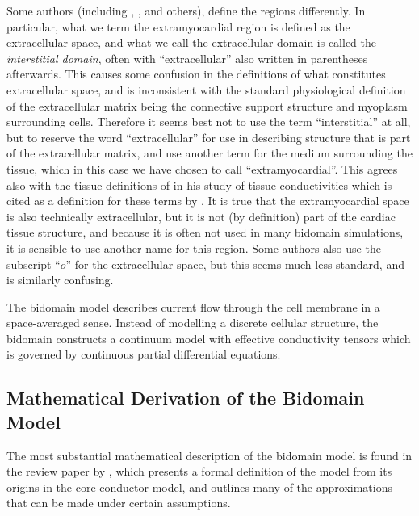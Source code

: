 Some authors (including \citet{pollard:pilkington:1993},
\citet{henriquez:1993}, \citet{plonsey:1987} and others), define the
regions differently.  In particular, what we term the extramyocardial region
is defined as the extracellular space, and what we call the extracellular
domain is called the \emph{interstitial domain}, often with ``extracellular''
also written in parentheses afterwards.  This causes some confusion in the
definitions of what constitutes extracellular space, and is inconsistent with
the standard physiological definition of the extracellular matrix being the
connective support structure and myoplasm surrounding cells.  Therefore it
seems best not to use the term ``interstitial'' at all, but to reserve the
word ``extracellular'' for use in describing structure that is part of the
extracellular matrix, and use another term for the medium surrounding the
tissue, which in this case we have chosen to call ``extramyocardial''.  This
agrees also with the tissue definitions of \citet{clerc:1976} in his
study of tissue conductivities which is cited as a definition for these terms
by \citet{pollard:pilkington:1993}.  It is true that the extramyocardial
space is also technically extracellular, but it is not (by definition) part of
the cardiac tissue structure, and because it is often not used in many
bidomain simulations, it is sensible to use another name for this region.
Some authors\cite{plonsey:1987} also use the subscript ``$o$'' for the
extracellular space, but this seems much less standard, and is similarly
confusing.

The bidomain model describes current flow through the cell membrane in a
space-averaged sense.  Instead of modelling a discrete cellular structure, the
bidomain constructs a continuum model with effective conductivity tensors
which is governed by continuous partial differential equations.  

\subsection{Mathematical Derivation of the Bidomain Model}

The most substantial mathematical description of the bidomain model is found
in the review paper by \citet{henriquez:1993}, which presents a formal
definition of the model from its origins in the core conductor model, and
outlines many of the approximations that can be made under certain
assumptions.

